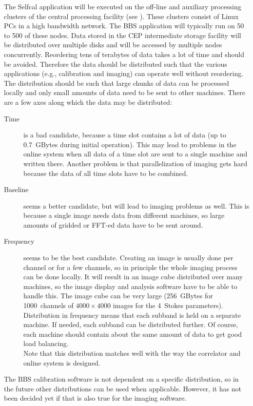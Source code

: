 \documentclass[10pt]{lofar}
\begin{document}
The Selfcal application will be executed on the off-line and auxiliary
processing clusters of the central processing facility (see
\cite{LOFAR-ASTRON-ADD-012}). These clusters consist of Linux PCs in a high
bandwidth network. The BBS application will typically run on 50 to 500 of these
nodes. %
Data stored in the CEP intermediate storage facility will be distributed over
multiple disks and will be accessed by multiple nodes concurrently.
Reordering tens of terabytes of data takes a lot of time and should be avoided.
Therefore the data should be distributed such that the various applications
(e.g., calibration and imaging) can operate well without reordering. The
distribution should be such that large chunks of data can be
processed locally and only small amounts of data need to be sent to other
machines. There are a few axes along which the data may be distributed:
\begin{description}
\item [Time] is a bad candidate, because a time slot contains a lot of data (up to
0.7~GBytes during initial operation). This may lead to problems in the online
system when all data of a time slot are sent to a single machine and written
there. Another problem is that parallelization of imaging gets hard because the
data of all time slots have to be combined.
\item [Baseline] seems a better candidate, but will lead to imaging problems as
well. This is because a single image needs data from different machines, so
large amounts of gridded or FFT-ed data have to be sent around.
\item [Frequency] seems to be the best candidate. Creating an image is usually
done per channel or for a few channels, so in principle the whole imaging
process can be done locally. It will result in an image cube distributed over
many machines, so the image display and analysis software have to be able to
handle this. The image cube can be very large (256~GBytes for 1000~channels of
$4000 \times 4000$ images for the 4~Stokes parameters). \\
Distribution in frequency means that each subband is held on a separate machine.
If needed, each subband can be distributed further. Of course, each machine
should contain about the same amount of data to get good load balancing. \\
Note that this distribution matches well with the way the correlator and online
system is designed.
\end{description}
The BBS calibration software is not dependent on a specific distribution, so in
the future other distributions can be used when applicable. However, it has not
been decided yet if that is also true for the imaging software.
\end{document}
